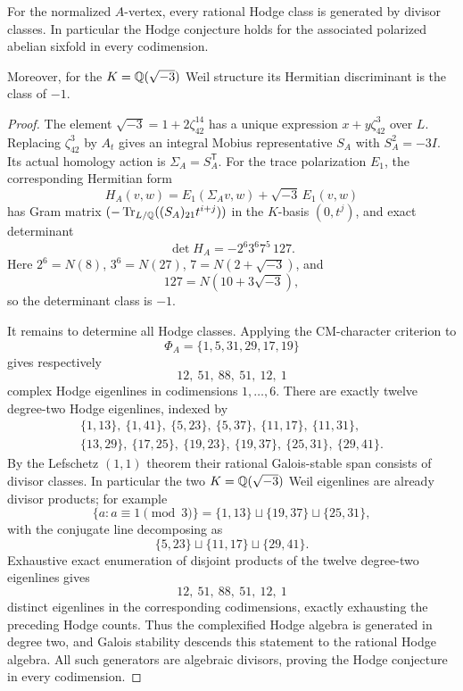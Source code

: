\begin{theorem}\label{thm:Ahodge}
For the normalized $A$-vertex, every rational Hodge class is generated by divisor classes.  In particular the Hodge conjecture holds for the associated polarized abelian sixfold in every codimension.

Moreover, for the $K=\mathbb Q(\sqrt{-3})$ Weil structure its Hermitian discriminant is the class of $-1$.
\end{theorem}
\begin{proof}
The element $\sqrt{-3}=1+2\zeta_{42}^{14}$ has a unique expression $x+y\zeta_{42}^3$ over $L$.  Replacing $\zeta_{42}^3$ by $A_t$ gives an integral Mobius representative $S_A$ with $S_A^2=-3I$. Its actual homology action is $\Sigma_A=S_A^{\mathsf T}$. For the trace polarization $E_1$, the corresponding Hermitian form
\[
 H_A(v,w)=E_1(\Sigma_Av,w)+\sqrt{-3}\,E_1(v,w)
\]
has Gram matrix $(-\operatorname{Tr}_{L/\mathbb Q}((S_A)_{21}t^{i+j}))$ in the $K$-basis $(0,t^j)$, and exact determinant
\[
 \det H_A=-2^6 3^6 7^5\,127.
\]
Here $2^6=N(8)$, $3^6=N(27)$, $7=N(2+\sqrt{-3})$, and
\[
 127=N(10+3\sqrt{-3}),
\]
so the determinant class is $-1$.

It remains to determine all Hodge classes.  Applying the CM-character criterion to
\[
 \Phi_A=\{1,5,31,29,17,19\}
\]
gives respectively
\[
 12,\ 51,\ 88,\ 51,\ 12,\ 1
\]
complex Hodge eigenlines in codimensions $1,\ldots,6$.  There are exactly twelve degree-two Hodge eigenlines, indexed by
\[
\begin{gathered}
 \{1,13\},\ \{1,41\},\ \{5,23\},\ \{5,37\},\
 \{11,17\},\ \{11,31\},\\
 \{13,29\},\ \{17,25\},\ \{19,23\},\ \{19,37\},\
 \{25,31\},\ \{29,41\}.
\end{gathered}
\]
By the Lefschetz $(1,1)$ theorem their rational Galois-stable span consists of divisor classes.  In particular the two $K=\mathbb Q(\sqrt{-3})$ Weil eigenlines are already divisor products; for example
\[
 \{a:a\equiv1\!\!\pmod3\}
 =\{1,13\}\sqcup\{19,37\}\sqcup\{25,31\},
\]
with the conjugate line decomposing as
\[
 \{5,23\}\sqcup\{11,17\}\sqcup\{29,41\}.
\]
Exhaustive exact enumeration of disjoint products of the twelve degree-two eigenlines gives
\[
 12,\ 51,\ 88,\ 51,\ 12,\ 1
\]
distinct eigenlines in the corresponding codimensions, exactly exhausting the preceding Hodge counts.  Thus the complexified Hodge algebra is generated in degree two, and Galois stability descends this statement to the rational Hodge algebra.  All such generators are algebraic divisors, proving the Hodge conjecture in every codimension.
\end{proof}

